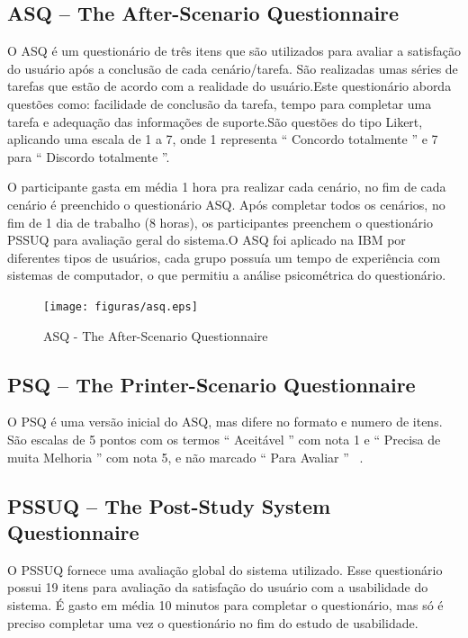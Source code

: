 \subsection{ASQ – The After-Scenario Questionnaire}

O ASQ é um questionário de três itens que são utilizados para avaliar a satisfação do usuário após a conclusão de cada cenário/tarefa. São realizadas umas séries de tarefas que estão de acordo com a realidade do usuário.Este questionário aborda questões como: facilidade de conclusão da tarefa, tempo para completar uma tarefa e adequação das informações de suporte.São questões do tipo Likert, aplicando uma escala de 1 a 7, onde 1 representa “ Concordo totalmente ” e 7 para “ Discordo totalmente ”. ~\cite{lewis1995ibm}

O participante gasta em média 1 hora pra realizar cada cenário, no fim de cada cenário é preenchido o questionário ASQ. Após completar todos os cenários, no fim de 1 dia de trabalho (8 horas), os participantes preenchem o questionário PSSUQ para avaliação geral do sistema.O ASQ foi aplicado na IBM por diferentes tipos de usuários, cada grupo possuía um tempo de experiência com sistemas de computador, o que permitiu a análise psicométrica do questionário.

\begin{figure}[!h]
    \centering
    \texttt{[image: figuras/asq.eps]}
    \label{ASQ - The After-Scenario Questionnaire }
	\caption{ASQ - The After-Scenario Questionnaire}
\end{figure}

\subsection{PSQ – The Printer-Scenario Questionnaire}

O PSQ  é uma versão inicial do ASQ, mas difere no formato e numero de itens.  São escalas de 5 pontos com os termos “ Aceitável ” com nota 1 e “ Precisa de muita Melhoria ” com nota 5, e não marcado “ Para Avaliar ” ~\cite{lewis1995ibm}.

\subsection{PSSUQ – The Post-Study System Questionnaire}

	O PSSUQ fornece uma avaliação global do sistema utilizado. Esse questionário possui 19 itens para avaliação da satisfação do usuário com a usabilidade do sistema. É gasto em média 10 minutos para completar o questionário, mas só é preciso completar uma vez o questionário no fim do estudo de usabilidade. ~\cite{lewis1995ibm} 

